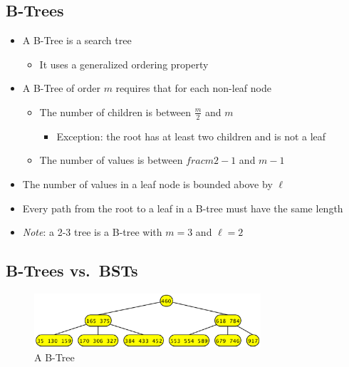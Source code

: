 \documentclass[
  10pt,
  english,
  letterpaper,
,tablecaptionabove
]{scrartcl}
\providecommand{\tightlist}{%
  \setlength{\itemsep}{0pt}\setlength{\parskip}{0pt}}
\begin{document}
\hypertarget{b-trees}{%
\subsection{B-Trees}\label{b-trees}}

\begin{itemize}
\tightlist
\item
  A B-Tree is a search tree

  \begin{itemize}
  \tightlist
  \item
    It uses a generalized ordering property
  \end{itemize}
\item
  A B-Tree of order \(m\) requires that for each non-leaf node

  \begin{itemize}
  \tightlist
  \item
    The number of children is between \(\frac{m}{2}\) and \(m\)

    \begin{itemize}
    \tightlist
    \item
      Exception: the root has at least two children and is not a leaf
    \end{itemize}
  \item
    The number of values is between \(frac{m}{2} - 1\) and \(m - 1\)
  \end{itemize}
\item
  The number of values in a leaf node is bounded above by \(\ell\)
\item
  Every path from the root to a leaf in a B-tree must have the same
  length
\item
  \emph{Note}: a 2-3 tree is a B-tree with \(m=3\) and \(\ell=2\)
\end{itemize}

\hypertarget{b-trees-vs.-bsts}{%
\subsection{B-Trees vs.~BSTs}\label{b-trees-vs.-bsts}}

\begin{figure}
\centering
\includegraphics[width=0.75\textwidth,height=\textheight]{images/3.png}
\caption{A B-Tree}
\end{figure}
\end{document}
